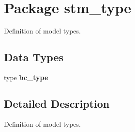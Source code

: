 \hypertarget{a00072}{
\section{Package stm\_\-type}
\label{a00072}
}
Definition of model types.  


\subsection*{Data Types}
\begin{CompactItemize}
\item 
type \textbf{bc\_\-type}
\end{CompactItemize}


\subsection{Detailed Description}
Definition of model types. 

